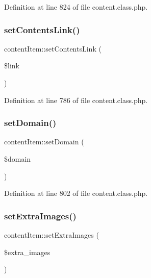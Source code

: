 Definition at line 824 of file content.\+class.\+php.

\hypertarget{classcontentItem_afe78ae4ab14d74305c86d27570d9a7f8}{}\label{classcontentItem_afe78ae4ab14d74305c86d27570d9a7f8} 
\subsubsection{\texorpdfstring{set\+Contents\+Link()}{setContentsLink()}}
{\footnotesize\ttfamily content\+Item\+::set\+Contents\+Link (\begin{DoxyParamCaption}\item[{}]{\$link }\end{DoxyParamCaption})}



Definition at line 786 of file content.\+class.\+php.

\hypertarget{classcontentItem_a61b6be878a0183cd1c3dfde8f29d5c20}{}\label{classcontentItem_a61b6be878a0183cd1c3dfde8f29d5c20} 
\subsubsection{\texorpdfstring{set\+Domain()}{setDomain()}}
{\footnotesize\ttfamily content\+Item\+::set\+Domain (\begin{DoxyParamCaption}\item[{}]{\$domain }\end{DoxyParamCaption})}



Definition at line 802 of file content.\+class.\+php.

\hypertarget{classcontentItem_a8f635dff719c18bf5e969b13ca901c74}{}\label{classcontentItem_a8f635dff719c18bf5e969b13ca901c74} 
\subsubsection{\texorpdfstring{set\+Extra\+Images()}{setExtraImages()}}
{\footnotesize\ttfamily content\+Item\+::set\+Extra\+Images (\begin{DoxyParamCaption}\item[{}]{\$extra\+\_\+images }\end{DoxyParamCaption})}



